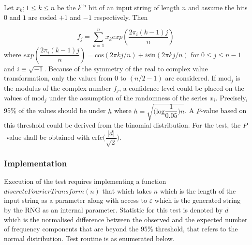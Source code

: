 Let $x_k; 1 \leq k \leq n$ be the $k^\text{th}$ bit of an input string of length $n$ and assume the bits $0$ and $1$ are coded $+1$ and $-1$ respectively. Then

\[
    f_j = \sum_{k=1}^{n} x_k exp(\dfrac{2\pi_i(k-1)j}{n})
\]
where $exp(\dfrac{2\pi_i(k-1)j}{n}) = \text{cos}(2\pi k j / n) + i\text{sin}(2\pi k j / n)$ for $0 \leq j \leq n-1$ and $i \equiv \sqrt{-1}$. Because of the symmetry of the real to complex value transformation, only the values from $0$ to $(n/2 - 1)$ are considered. If $\text{mod}_j$ is the modulus of the complex number $f_j$, a confidence level could be placed on the values of $\text{mod}_j$ under the assumption of the randomness of the series $x_i$. Precisely, 95\% of the values should be under $h$ where $h = \sqrt{\bigg(\text{log}\dfrac{1}{0.05}\bigg)n}$. A $P$-value based on this threshold could be derived from the binomial distribution. For the test, the $P$-value shall be obtained with $\text{erfc}\bigg(\dfrac{\lvert d \rvert}{\sqrt{2}}\bigg)$.

\subsubsection{Implementation}

Execution of the test requires implementing a function $\textit{discreteFourierTransform}(n)$ that which takes $n$ which is the length of the input string as a parameter along with access to $\varepsilon$ which is the generated string by the RNG as an internal parameter. Statistic for this test is denoted by $d$ which is the normalised difference between the observed and the expected number of frequency components that are beyond the 95\% threshold, that refers to the normal distribution. Test routine is as enumerated below.

